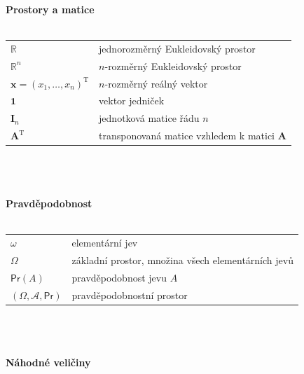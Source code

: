 \documentclass[a4paper,12pt]{report}
\theoremstyle{definition} \newtheorem{definice}[veta]{Definice}
\theoremstyle{remark}
\begin{document}
\normalsize
\textbf{Prostory a matice}\\\\
   \begin{tabular}{p{4cm} p{9.3cm}}
   $\mathbb{R}$                              &   jednorozměrný Eukleidovský prostor \\
   $\mathbb{R}^n$                              &     $n$-rozměrný Eukleidovský prostor \\
   $\boldsymbol{x}=(x_1,\ldots,x_n)^\mathrm{T}$             &    $n$-rozměrný reálný vektor \\
    $\boldsymbol{1}$                           &   vektor jedniček\\
   $\mathbf{I}_n$                              &    jednotková matice řádu $n$ \\
   $\mathbf{A}^\mathrm{T}$                              &   transponovaná matice vzhledem k matici $\mathbf{A}$\\
   \end{tabular}\\\\\\
%
%
\textbf{Pravděpodobnost}\\\\
   \begin{tabular}{p{4cm} p{9.3cm}}
   $\omega$				        & elementární jev\\
   $\Omega$                                          &   základní prostor, množina všech elementárních jevů \\
   $\mathsf{Pr}(A)$                               &  pravděpodobnost jevu $A$ \\
   $(\Omega,\mathcal{A}, \mathsf{Pr})$                         &   pravděpodobnostní prostor \\
   \end{tabular}\\\\\\
%
%
%
\textbf{Náhodné veličiny}\\\\
\end{document}
